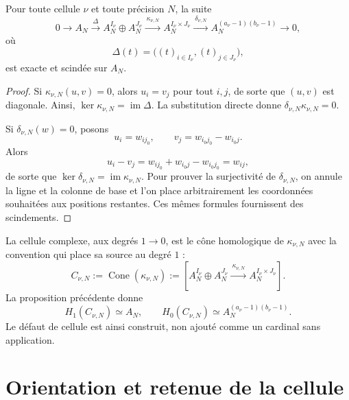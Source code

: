 \begin{proposition}
\label{prop:pdfv2-coh-cell-exact}
Pour toute cellule \(\nu\) et toute précision \(N\), la suite
\begin{equation}\label{eq:pdfv2-coh-exact-sequence}
 0\longrightarrow A_N
 \xrightarrow{\ \Delta\ }
 A_N^{I_\nu}\oplus A_N^{J_\nu}
 \xrightarrow{\ \kappa_{\nu,N}\ }
 A_N^{I_\nu\times J_\nu}
 \xrightarrow{\ \delta_{\nu,N}\ }
 A_N^{(a_\nu-1)(b_\nu-1)}
 \longrightarrow0,
\end{equation}
où
\[
 \Delta(t)=\bigl((t)_{i\in I_\nu},(t)_{j\in J_\nu}\bigr),
\]
est exacte et scindée sur \(A_N\).
\end{proposition}

\begin{proof}
Si \(\kappa_{\nu,N}(u,v)=0\), alors \(u_i=v_j\) pour tout \(i,j\),
de sorte que \((u,v)\) est diagonale. Ainsi,
\(\ker\kappa_{\nu,N}=\operatorname{im}\Delta\). La substitution directe donne
\(\delta_{\nu,N}\kappa_{\nu,N}=0\).

Si \(\delta_{\nu,N}(w)=0\), posons
\[
 u_i=w_{i j_0},
 \qquad
 v_j=w_{i_0j_0}-w_{i_0j}.
\]
Alors
\[
 u_i-v_j=w_{i j_0}+w_{i_0j}-w_{i_0j_0}=w_{ij},
\]
de sorte que \(\ker\delta_{\nu,N}=\operatorname{im}\kappa_{\nu,N}\). Pour
prouver la surjectivité de \(\delta_{\nu,N}\), on annule la ligne et la
colonne de base et l'on place arbitrairement les coordonnées souhaitées aux
positions restantes. Ces mêmes formules fournissent des scindements.
\end{proof}

La cellule complexe, aux degrés \(1\to0\), est le cône homologique de
\(\kappa_{\nu,N}\) avec la convention qui place sa source au degré \(1\) :
\begin{equation}\label{eq:pdfv2-coh-cell-complex}
 C_{\nu,N}:=\operatorname{Cone}(\kappa_{\nu,N})
 :=\left[
 A_N^{I_\nu}\oplus A_N^{J_\nu}
 \xrightarrow{\ \kappa_{\nu,N}\ }
 A_N^{I_\nu\times J_\nu}
 \right].
\end{equation}
La proposition précédente donne
\begin{equation}\label{eq:pdfv2-coh-cell-homology}
 H_1(C_{\nu,N})\simeq A_N,
 \qquad
 H_0(C_{\nu,N})\simeq A_N^{(a_\nu-1)(b_\nu-1)}.
\end{equation}
Le défaut de cellule est ainsi construit, non ajouté comme un cardinal sans
application.

\section{Orientation et retenue de la cellule}
\label{sec:pdfv2-coh-orientation-carry}

